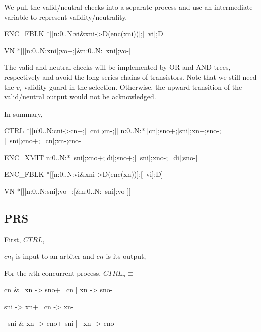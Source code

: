 \documentclass{article}
\begin{document}
We pull the valid/neutral checks into a separate process and use an intermediate variable to represent validity/neutrality.

\begin{hse}
ENC_FBLK\equiv
*[[\langle[]n:0..N:vi&xni->D(enc(xni))\Uparrow\rangle];[~vi];D\Downarrow]

VN\equiv
*[[\langle|n:0..N:xni\rangle];vo+;[\langle&n:0..N:~xni\rangle];vo-]]
\end{hse}

\noindent The valid and neutral checks will be implemented by OR and AND trees, respectively and avoid the long series chains of transistors. Note that we still need the $v_i$ validity guard in the selection. Otherwise, the upward transition of the valid/neutral output would not be acknowledged.

In summary,

\begin{hse}
CTRL\equiv
*[[\langle\|n:0..N:cni->cn+;[~cni];cn-;\rangle]] \pll
\langle\pll\!n:0..N:*[[cn];sno+;[sni];xn+;sno-;[~sni];cno+;[~cn];xn-;cno-]\rangle
\end{hse}

\begin{hse}
ENC_XMIT\equiv
\langle\pll\!n:0..N:*[[sni];xno+;[di];sno+;[~sni];xno-;[~di];sno-]\rangle
\end{hse}

\begin{hse}
ENC_FBLK\equiv
*[[\langle[]n:0..N:vi&xni->D(enc(xn))\Uparrow\rangle];[~vi];D\Downarrow]

VN\equiv
*[[\langle|n:0..N:sni\rangle];vo+;[\langle&n:0..N:~sni\rangle];vo-]]
\end{hse}

\subsection{PRS}

First, $CTRL$,

$cn_i$ is input to an arbiter and $cn$ is its output,

For the $n$th concurrent process, $CTRL_n\equiv$
\begin{prs2}
cn & ~xn -> sno+
~cn | xn -> sno-

sni -> xn+
~cn -> xn-

~sni & xn -> cno+
sni | ~xn -> cno-
\end{prs2}
\end{document}
